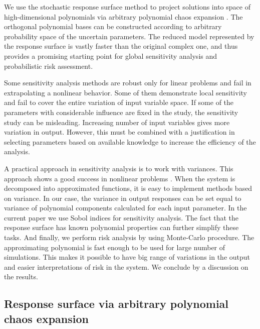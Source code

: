 We use the stochastic response surface method to project solutions into space of
high-dimensional polynomials via arbitrary polynomial chaos expansion
\cite{oladyshkin2011concept}. The orthogonal polynomial bases can be constructed
according to arbitrary probability space of the uncertain parameters. The
reduced model represented by the response surface is vastly faster than the
original complex one, and thus provides a promising starting point for global
sensitivity analysis and probabilistic risk assessment.  

Some sensitivity analysis methods are robust only for linear problems and fail
in extrapolating a nonlinear behavior. Some of them demonstrate local
sensitivity and fail to cover the entire variation of input variable space. If
some of the parameters with considerable influence are fixed in the study, the
sensitivity study can be misleading. Increasing number of input variables gives
more variation in output. However, this must be combined with a justification in
selecting parameters based on available knowledge to increase the efficiency of
the analysis. 

A practical approach in sensitivity analysis is to work with variances. This
approach shows a good success in nonlinear problems \cite{reuter2008global}.
When the system is decomposed into approximated functions, it is easy to
implement methods based on variance. In our case, the variance in output
responses can be set equal to variance of polynomial components calculated for
each input parameter. In the current paper we use Sobol indices
\cite{sobol2001global} for sensitivity analysis. The fact that the response
surface has known polynomial properties \cite{OladNowakBarros_AWR2011} can
further simplify these tasks. And finally, we perform risk analysis by using
Monte-Carlo procedure. The approximating polynomial is fast enough to be used
for large number of simulations. This makes it possible to have big range of
variations in the output and easier interpretations of risk in the system. We
conclude by a discussion on the results.



\subsection{Response surface via arbitrary polynomial chaos expansion}

